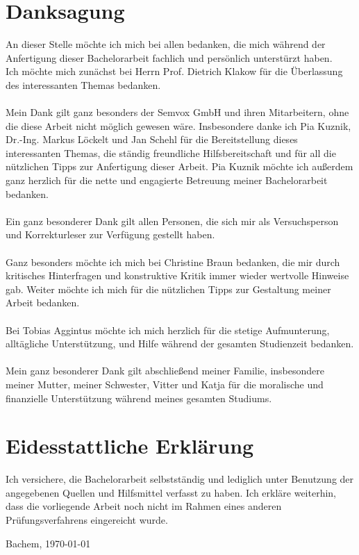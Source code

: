 \documentclass[12pt,a4paper]{scrartcl}
\begin{document}
\section*{Danksagung}
An dieser Stelle möchte ich mich bei allen bedanken, die mich während der Anfertigung dieser Bachelorarbeit fachlich und persönlich unterstürzt haben.\\



Ich möchte mich zunächst bei Herrn Prof. Dietrich Klakow für die Überlassung des interessanten Themas bedanken.\\
\\
Mein Dank gilt ganz besonders der Semvox GmbH und ihren Mitarbeitern, ohne die diese Arbeit nicht möglich gewesen wäre. Insbesondere danke ich Pia Kuznik, Dr.-Ing. Markus Löckelt und Jan Schehl für die Bereitstellung dieses interessanten Themas, die ständig freundliche Hilfsbereitschaft und für all die nützlichen Tipps zur Anfertigung dieser Arbeit. 
Pia Kuznik möchte ich außerdem ganz herzlich für die nette und engagierte Betreuung meiner Bachelorarbeit bedanken.\\
\\
Ein ganz besonderer Dank gilt allen Personen, die sich mir als Versuchsperson und Korrekturleser zur Verfügung
gestellt haben.\\
\\
Ganz besonders möchte ich mich bei Christine Braun bedanken, die mir durch kritisches Hinterfragen und konstruktive Kritik immer wieder wertvolle Hinweise gab. Weiter möchte ich mich für die nützlichen Tipps zur Gestaltung meiner Arbeit bedanken.\\
\\
Bei Tobias Aggintus möchte ich mich herzlich für die stetige Aufmunterung, alltägliche Unterstützung, 
und Hilfe während der gesamten Studienzeit bedanken. \\
\\
Mein ganz besonderer Dank gilt abschließend meiner Familie, insbesondere meiner Mutter, meiner Schwester, Vitter und Katja für die moralische und finanzielle Unterstützung während meines gesamten Studiums. \\
\cfoot{}
\cleardoublepage

\section*{Eidesstattliche Erklärung}

\cfoot{}
Ich versichere, die Bachelorarbeit selbstständig und lediglich unter Benutzung der angegebenen Quellen und Hilfsmittel verfasst zu haben.
\newline
\newline
Ich erkläre weiterhin, dass die vorliegende Arbeit noch nicht im Rahmen eines anderen Prüfungsverfahrens eingereicht wurde.
\newline
\newline

Bachem, \today
\end{document}
